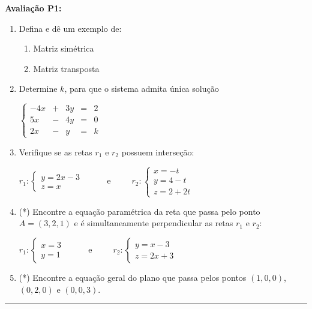 \documentclass{article}
\begin{document}
{\bf Avalia\c{c}\~ao P1:}
\begin{enumerate}
\item Defina e d\^e um exemplo de:
	\begin{enumerate}
		\item Matriz sim\'etrica
		\item Matriz transposta
	\end{enumerate}

\item Determine $k$, para que o sistema admita \'unica solu\c{c}\~ao

$\left\{\begin{array}{ccccc}
	-4x & + & 3y & = & 2 \\
	5x & - & 4y & = & 0 \\
	2x & - & y & = & k
\end{array}\right.$

\item Verifique se as retas $r_1$ e $r_2$ possuem interse\c{c}\~ao:

$r_1:\left\{\begin{array}{l}
	y = 2x - 3 \\
	z = x
\end{array}\right.$
\ \ \ \ \ e\ \ \ \ \ 
$r_2:\left\{\begin{array}{l}
	x = -t \\
	y = 4 - t \\
	z = 2 + 2t
\end{array}\right.$

\item (*) Encontre a equa\c{c}\~ao param\'etrica da reta que passa pelo ponto $A = (3, 2, 1)$ e \'e simultaneamente perpendicular as retas $r_1$ e $r_2$:

$r_1:\left\{\begin{array}{l}
	x = 3 \\
	y = 1
\end{array}\right.$
\ \ \ \ \ e\ \ \ \ \ 
$r_2:\left\{\begin{array}{l}
	y = x - 3 \\
	z = 2x + 3
\end{array}\right.$

\item (*) Encontre a equa\c{c}\~ao geral do plano que passa pelos pontos $(1, 0, 0)$, $(0, 2, 0)$ e $(0, 0, 3)$.

\end{enumerate}
\noindent{}\rule{\textwidth}{0.4pt}
\end{document}
